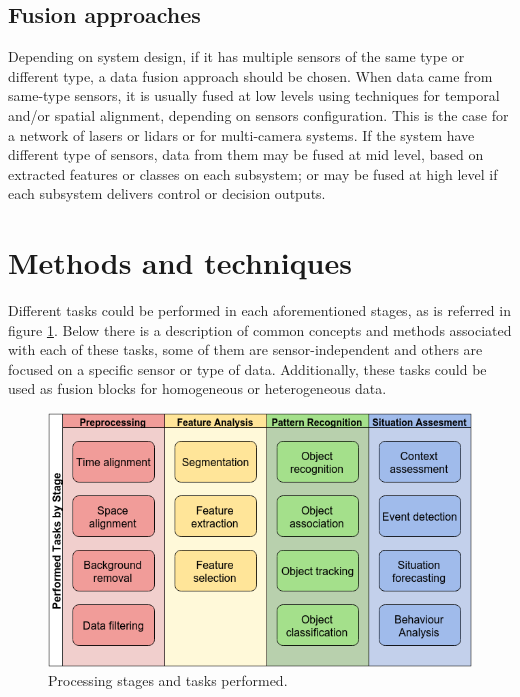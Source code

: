 \subsection{Fusion approaches}

Depending on system design, if it has multiple sensors of the same type or different type, a data fusion approach should be chosen. When data came from same-type sensors, it is usually fused at low levels using techniques for temporal and/or spatial alignment, depending on sensors configuration. This is the case for a network of lasers or lidars or for multi-camera systems. If the system have different type of sensors, data from them may be fused at mid level, based on extracted features or classes on each subsystem; or may be fused at high level if each subsystem delivers control or decision outputs.

\section{Methods and techniques}

Different tasks could be performed in each aforementioned stages, as is referred in figure \ref{proc_stages_tasks}. Below there is a description of common concepts and methods associated with each of these tasks, some of them are sensor-independent and others are focused on a specific sensor or type of data. Additionally, these tasks could be used as fusion blocks for homogeneous or heterogeneous data.

\begin{figure}[ht!]
\centering
\includegraphics[scale=0.55]{fig/3/processing_stages_and_tasks.png}
\caption{Processing stages and tasks performed.}
\label{proc_stages_tasks}
\end{figure}

